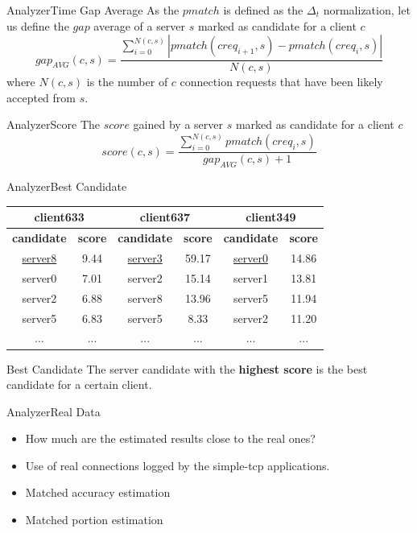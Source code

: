 	\begin{frame}{Analyzer}{Time Gap Average}
As the $pmatch$ is defined as the $\Delta_t$ normalization, let
us define the $gap$ average of a server $s$ marked as candidate for a client $c$ 
		\begin{equation}
		 	gap_{AVG}(c,s) = \frac{\sum\limits^{N(c,s)}_{i=0} 
			| pmatch(creq_{i+1},s) - pmatch(creq_{i},s)|}{N(c,s)}
		\end{equation}
		where $N(c,s)$ is the number of $c$ connection requests that have been likely 
accepted from $s$.

	\end{frame}
		
	\begin{frame}{Analyzer}{Score}
		The $score$ gained by a server $s$ marked as candidate for a
client $c$
		\begin{equation}
			score(c,s) = \frac{\sum\limits^{N(c,s)}_{i=0} pmatch(creq_{i},s)}{gap_{AVG}(c,s) + 1}
		\end{equation}

	\end{frame}

	\begin{frame}{Analyzer}{Best Candidate}
		\begin{center}
			\begin{tabular}{ | c | c || c | c || c | c |  }
				\hline
				\multicolumn{2}{|c||}{client633} &
	\multicolumn{2}{c||}{client637} & \multicolumn{2}{|c|}{client349}\\
				\hline
				\textbf{candidate} 	& \textbf{score} &
\textbf{candidate}  & \textbf{score} & \textbf{candidate} &
\textbf{score} \\
				\hline
				\underline{server8}     & 9.44  & \underline{server3}  &
59.17   & \underline{server0}   & 14.86  \\
				server0     & 7.01  &  server2 & 15.14    & server1   & 13.81\\
				server2 	& 6.88  &  server8 & 13.96    & server5   & 11.94\\
				server5     & 6.83  &  server5 & 8.33     & server2   & 11.20\\
				... 		& ...   &  ... 	   & ...      & ...       & ...\\
				\hline
			\end{tabular}	
		\end{center}
		\begin{block}{Best Candidate}		
			The server candidate with the \textbf{highest score} is the best
			candidate for a certain client.
		\end{block}
	\end{frame}
	\begin{frame}{Analyzer}{Real Data}
		\begin{itemize}
			\item How much are the estimated results close to
the real ones?
			\item Use of real connections logged by the simple-tcp
applications.
			\item Matched accuracy estimation
			\item Matched portion  estimation  
		\end{itemize}
	\end{frame}
		
